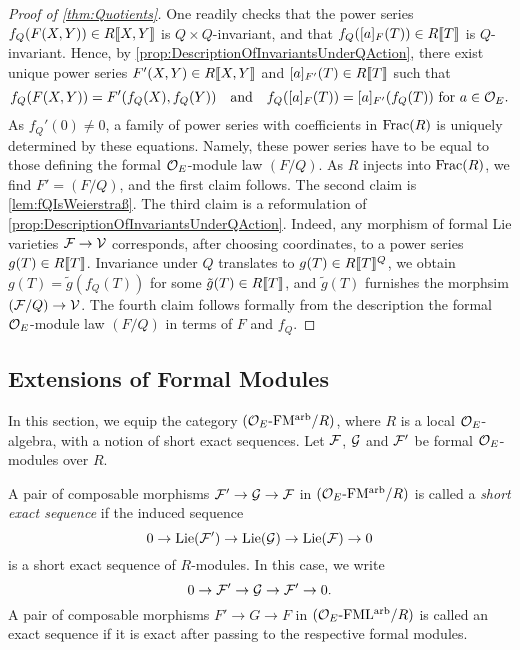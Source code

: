 \documentclass[../main.tex]{subfiles}
\begin{document}
\begin{proof}[Proof of \cref{thm:Quotients}]
  One readily checks that the power series 
  $f_Q(F(X,Y)) \in R\llbracket X,Y \rrbracket$ is $Q\times Q$-invariant, and that 
  $f_Q([a]_F(T)) \in R\llbracket T \rrbracket$ is $Q$-invariant. Hence, 
  by \cref{prop:DescriptionOfInvariantsUnderQAction}, there exist unique power
  series
  $F'(X,Y) \in R\llbracket X,Y \rrbracket$ and $[a]_{F'}(T) \in R\llbracket T \rrbracket$ such that 
  \begin{equation*}
    f_Q(F(X,Y)) = F'(f_Q(X),f_Q(Y)) \quad \text{and} \quad 
    f_Q([a]_F(T)) = [a]_{F'}(f_Q(T)) \text{ for }a\in \mathcal{O}_E.
  \end{equation*}
  As $f_Q'(0) \neq 0$, a family of power series with coefficients in $\mathrm{Frac}(R)$
  is uniquely determined by these equations. Namely, these power series have
  to be equal to those defining the formal $\mathcal{O}_E$-module law $(F/Q)$. As $R$
  injects into $\mathrm{Frac}(R)$, we find $F' = (F/Q)$, and the first claim follows.
  The second claim is \cref{lem:fQIsWeierstraß}.
  The third claim is a reformulation of
  \cref{prop:DescriptionOfInvariantsUnderQAction}. Indeed, any morphism of formal
  Lie varieties $\mathcal{F} \to \mathcal{V}$ corresponds, after choosing coordinates, to a 
  power series $g(T) \in R\llbracket T \rrbracket$. Invariance under $Q$ translates to 
  $g(T) \in R\llbracket T \rrbracket^Q$, we obtain $g(T) = \tilde g (f_Q(T))$ for
  some $\tilde g(T) \in R\llbracket T \rrbracket$, and 
  $\tilde g(T)$ furnishes the morphsim $(\mathcal{F}/Q)\to \mathcal{V}$. The
  fourth claim follows formally from the description the formal 
  $\mathcal{O}_E$-module law $(F/Q)$ in terms of $F$ and $f_Q$.
\end{proof}


\subsection{Extensions of Formal Modules} %
\label{sub:Extensions of Formal Modules}
In this section, we equip the category ${({\mathcal{O}_E}\textnormal-\allowbreak\mathrm{FM^{arb}}/{R})}$, where $R$ is a
local $\mathcal{O}_E$-algebra, with a notion of short exact sequences. 
Let $\mathcal{F}$, $\mathcal{G}$ and $\mathcal{F}'$ be formal $\mathcal{O}_E$-modules over $R$. 

\begin{defi}\label{def:SESofFormalModules}
  A pair of composable morphisms $\mathcal{F}' \to \mathcal{G} \to \mathcal{F}$ in 
  ${({\mathcal{O}_E}\textnormal-\allowbreak\mathrm{FM^{arb}}/{R})}$ is called 
  a \emph{short exact sequence} if the induced sequence 
  \begin{equation*}
    0 \to \operatorname{Lie}(\mathcal{F}') \to \operatorname{Lie}(\mathcal{G}) \to \operatorname{Lie}(\mathcal{F}) \to 0
  \end{equation*}
  is a short exact sequence of $R$-modules. In this case, we write
  \begin{equation*}
    0 \to \mathcal{F}' \to \mathcal{G} \to \mathcal{F}' \to 0.
  \end{equation*}
  A pair of composable morphisms $F' \to G \to F$ in ${({\mathcal{O}_E}\textnormal-\allowbreak\mathrm{FML^{arb}}/{R})}$
  is called an exact sequence if it is exact after passing to 
  the respective formal modules. 
\end{defi}
\end{document}
